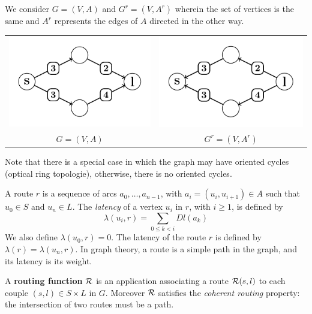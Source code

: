 \documentclass{article}
\begin{document}
We consider $G=(V,A)$ and $G^r=(V,A^r)$ wherein the set of vertices is the same and $A^r$ represents the edges of $A$ directed in the other way. 
\newline

\begin{tabular}{cc}
\includegraphics[scale=0.8]{Fig2.pdf} & \includegraphics[scale=0.8]{Fig3.pdf}\\
 $G=(V,A)$ & $G^r=(V,A^r)$\\
\end{tabular}\newline
Note that there is a special case in which the graph may have oriented cycles (optical ring topologie),
otherwise, there is no oriented cycles.

A route $r$ is a sequence of arcs $a_0, \ldots , a_{n-1}$, with $a_i=(u_i,u_{i+1}) \in A$ such that $u_0 \in S$ and $u_n \in L$.
The {\em latency} of a vertex $u_i$ in $r$, with $i \geq 1$, is defined by $$\lambda(u_i,r)= \sum\limits_{0 \leq k <i} Dl(a_k)$$ We also define $\lambda(u_0,r)=0$.
The latency of the route $r$ is defined by $\lambda (r)= \lambda (u_n,r)$. In graph theory, a route is a simple path in the graph, and its latency is its weight. 


A {\bf routing function} ${\cal R}$ is an application associating a route ${\cal R}(s,l)$ to each couple $(s,l) \in S \times L$ in $G$.
Moreover ${\cal R}$ satisfies the \emph{coherent routing} property: the intersection of two routes must be a path.
\end{document}
